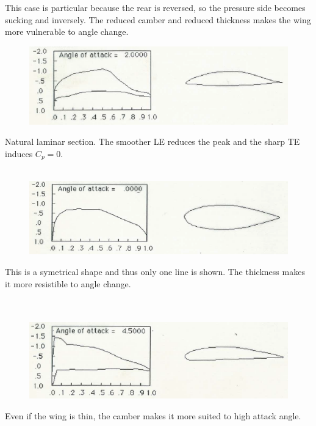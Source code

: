 			This case is particular because the rear is reversed, so the pressure side becomes sucking and inversely. The reduced camber and reduced thickness makes the wing more vulnerable to angle change.
			
			\begin{figure}
			\vspace{-5mm}
			\includegraphics[scale=0.5]{ch2/6}
			\end{figure}
			Natural laminar section. The smoother LE reduces the peak and the sharp TE induces $C_p = 0$.\\\\
			
			\begin{figure}
			\vspace{-5mm}
			\includegraphics[scale=0.5]{ch2/8}
			\end{figure}
			This is a symetrical shape and thus only one line is shown. The thickness makes it more resistible to angle change. \\\\\\
			
			\begin{figure}
			\vspace{-5mm}
			\includegraphics[scale=0.5]{ch2/9}
			\end{figure}
			Even if the wing is thin, the camber makes it more suited to high attack angle. \\\\\\
		
